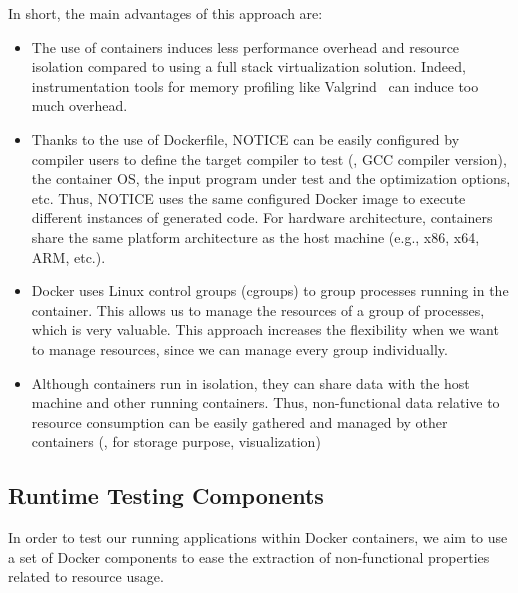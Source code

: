 In short, the main advantages of this approach are:
\begin{itemize}
	\item The use of containers induces less performance overhead and resource isolation compared to using a full stack virtualization solution. Indeed, instrumentation tools for memory profiling like Valgrind~\cite{nethercote2007valgrind} can induce too much overhead.
	\item Thanks to the use of Dockerfile, NOTICE can be easily configured by compiler users to define the target compiler to test (\eg, GCC compiler version), the container OS, the input program under test and the optimization options, etc. Thus, NOTICE uses the same configured Docker image to execute different instances of generated code. For hardware architecture, containers share the same platform architecture as the host machine (e.g., x86, x64, ARM, etc.). 
	\item Docker uses Linux control groups (cgroups) to group processes running in the container. This allows us to manage the resources of a group of processes, which is very valuable. 
	This approach increases the flexibility when we want to manage resources, since we can manage every group individually. 
	\item Although containers run in isolation, they can share data with the host machine and other running containers. Thus, non-functional data relative to resource consumption can be easily gathered and managed by other containers (\ie, for storage purpose, visualization)
\end{itemize}


\subsection{Runtime Testing Components}
In order to test our running applications within Docker containers, we aim to use a set of Docker components to ease the extraction of non-functional properties related to resource usage.
